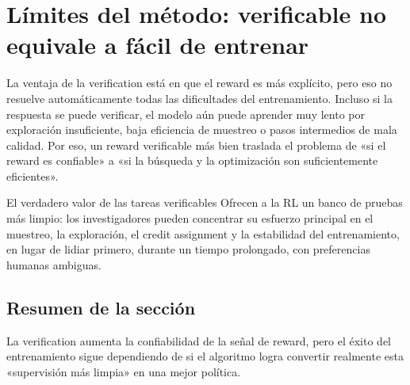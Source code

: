 \section{Límites del método: verificable no equivale a fácil de entrenar}
La ventaja de la verification está en que el reward es más explícito, pero eso no resuelve automáticamente todas las dificultades del entrenamiento. Incluso si la respuesta se puede verificar, el modelo aún puede aprender muy lento por exploración insuficiente, baja eficiencia de muestreo o pasos intermedios de mala calidad. Por eso, un reward verificable más bien traslada el problema de «si el reward es confiable» a «si la búsqueda y la optimización son suficientemente eficientes».

\begin{importantbox}{El verdadero valor de las tareas verificables}
Ofrecen a la RL un banco de pruebas más limpio: los investigadores pueden concentrar su esfuerzo principal en el muestreo, la exploración, el credit assignment y la estabilidad del entrenamiento, en lugar de lidiar primero, durante un tiempo prolongado, con preferencias humanas ambiguas.
\end{importantbox}

\subsection{Resumen de la sección}
La verification aumenta la confiabilidad de la señal de reward, pero el éxito del entrenamiento sigue dependiendo de si el algoritmo logra convertir realmente esta «supervisión más limpia» en una mejor política.

\newpage
